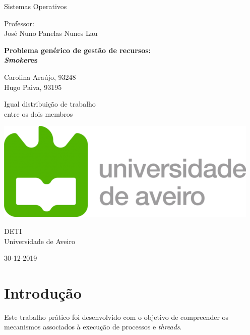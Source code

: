 \documentclass[10pt,portuguese]{article}
\begin{document}
\begin{titlepage}
	\clearpage\thispagestyle{empty}
	\centering
	\vspace{2cm}

	
	{\Large  Sistemas Operativos \par}
	\vspace{0.5cm}
	{\small Professor: \\
	José Nuno Panelas Nunes Lau\par}
	\vspace{4cm}
	{ \textbf{Problema genérico de gestão de recursos:}} \\
	\vspace{0.5cm}
	{\Huge \textbf{\textit{Smoker}es}} \\
	\vspace{1cm}
	\vspace{4cm}
	{\normalsize Carolina Araújo, 93248 \\ 
	             Hugo Paiva, 93195
	   \par}
	   	{\tiny
	Igual distribuição de trabalho \\entre os dois membros\par}
	\vspace{2cm}

    \includegraphics[scale=0.20]{images/logo_ua.png}
    
    \vspace{2cm}
    
	{\normalsize DETI \\ 
		Universidade de Aveiro \par}
		
	{\normalsize 30-12-2019 \par}
	\vspace{2cm}
		
	
	\pagebreak

\end{titlepage}
\tableofcontents{}
\clearpage

\section{Introdução}
\par Este trabalho prático foi desenvolvido com o objetivo de compreender os mecanismos associados à execução de processos e \textit{threads}. 
\end{document}
